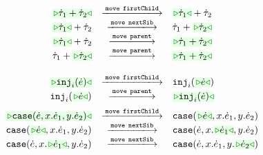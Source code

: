 \begin{figure}
\begin{displaymath}
\begin{array}{@{}rcl}
  \TABperformMove
      {\zwsel{\tsum{\htau_1}{\htau_2}}}
      {\aMove{\dChild}}
      {      {\tsum{\zwsel{\htau_1}}{\htau_2}}}
  \\
  \TABperformMove
      {      {\tsum{\zwsel{\htau_1}}{\htau_2}}}
      {\aMove{\dNext}}
      {      {\tsum{{\htau_1}}{\zwsel{\htau_2}}}}
  \\
  \TABperformMove
      {      {\tsum{\zwsel{\htau_1}}{\htau_2}}}
      {\aMove{\dParent}}
      {\zwsel{\tsum{{\htau_1}}{{\htau_2}}}}
  \\
  \TABperformMove
      {      {\tsum{{\htau_1}}{{\zwsel{\htau_2}}}}}
      {\aMove{\dParent}}
      {\zwsel{\tsum{{\htau_1}}{\htau_2}}}
  \\[2mm]
\end{array}
\end{displaymath}
\begin{displaymath}
\begin{array}{@{}rcl}
  \TABperformMove
      {\zwsel{\hinj{i}{\hexp}}}
      {\aMove{\dChild}}
      {\hinj{i}{\zwsel{\hexp}}}
  \\
  \TABperformMove
      {\hinj{i}{\zwsel{\hexp}}}
      {\aMove{\dParent}}
      {\zwsel{\hinj{i}{\hexp}}}
  \\[2mm]
  \TABperformMove
      {\zwsel{\hcase{\hexp}{x}{\hexp_1}{y}{\hexp_2}}}
      {\aMove{\dChild}}
      {      {\hcase{\zwsel{\hexp}}{x}{\hexp_1}{y}{\hexp_2}}}
  \\
  \TABperformMove
      {      {\hcase{\zwsel{\hexp}}{x}{\hexp_1}{y}{\hexp_2}}}
      {\aMove{\dNext}}
      {      {\hcase{{\hexp}}{x}{\zwsel{\hexp_1}}{y}{\hexp_2}}}
  \\
  \TABperformMove
      {      {\hcase{{\hexp}}{x}{\zwsel{\hexp_1}}{y}{\hexp_2}}}
      {\aMove{\dNext}}
      {      {\hcase{{\hexp}}{x}{{\hexp_1}}{y}{\zwsel{\hexp_2}}}}

\end{array}
\end{displaymath}
\end{figure}
